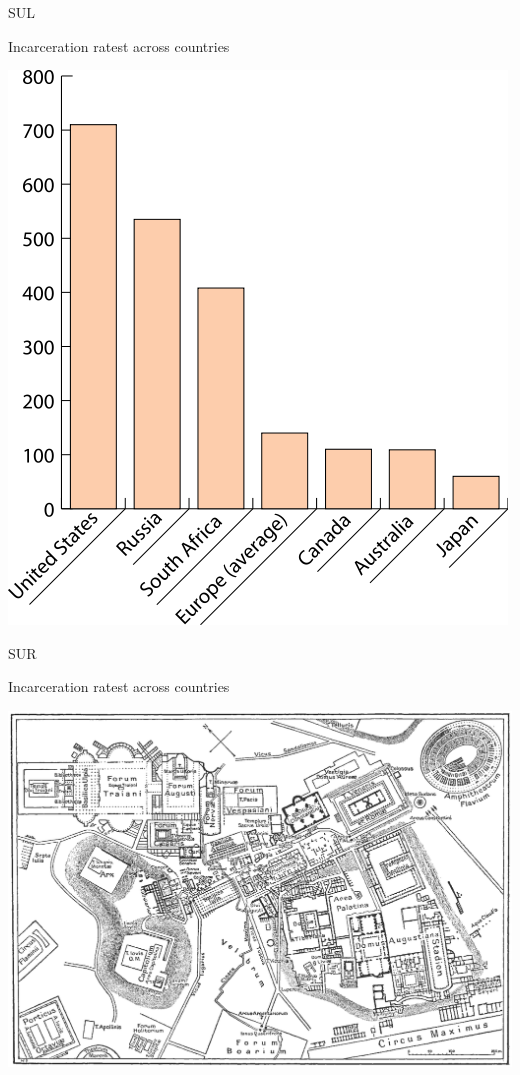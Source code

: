 \begin{chart}{S}{UL}
\caption{Incarceration ratest across countries}
\label{chart:incarceration}
\includegraphics[width=\chartwidth,height=\chartheight]{incarceration}  
\end{chart}

\begin{chart}{S}{UR}
\caption{Incarceration ratest across countries}
\label{chart:incarceration}
\includegraphics[width=\chartwidth,height=\chartheight]{Rome}  
\end{chart}

